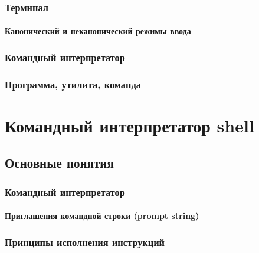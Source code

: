 \documentclass[oneside]{book}
\begin{document}
      \section{Терминал}
      

         \subsection{Канонический и неканонический режимы ввода}
         

      \section{Командный интерпретатор}
      

      \section{Программа, утилита, команда}
      



\clearpage \part{Командный интерпретатор shell}
%

   \chapter{Основные понятия}

      \section{Командный интерпретатор}
      

         \subsection{Приглашения командной строки (prompt string)}
         			

      \section{Принципы исполнения инструкций}
\end{document}
